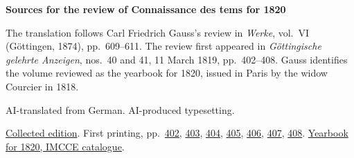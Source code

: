 \clearpage\thispagestyle{empty}
\begin{center}\Large\bfseries Sources for the review of Connaissance des tems for 1820\end{center}

The translation follows Carl Friedrich Gauss’s review in \emph{Werke}, vol.~VI (Göttingen, 1874), pp.~609--611. The review first appeared in \emph{Göttingische gelehrte Anzeigen}, nos.~40 and 41, 11 March 1819, pp.~402--408. Gauss identifies the volume reviewed as the yearbook for 1820, issued in Paris by the widow Courcier in 1818.

AI-translated from German. AI-produced typesetting.

\href{https://gdz.sub.uni-goettingen.de/id/PPN236007467}{Collected edition}. First printing, pp.~\href{https://images.p.sub.uni-goettingen.de/iiif/image/gdz:PPN319721507_1819:00000404/full/1650,/0/default.jpg}{402}, \href{https://images.p.sub.uni-goettingen.de/iiif/image/gdz:PPN319721507_1819:00000405/full/1650,/0/default.jpg}{403}, \href{https://images.p.sub.uni-goettingen.de/iiif/image/gdz:PPN319721507_1819:00000406/full/1650,/0/default.jpg}{404}, \href{https://images.p.sub.uni-goettingen.de/iiif/image/gdz:PPN319721507_1819:00000407/full/1650,/0/default.jpg}{405}, \href{https://images.p.sub.uni-goettingen.de/iiif/image/gdz:PPN319721507_1819:00000408/full/1650,/0/default.jpg}{406}, \href{https://images.p.sub.uni-goettingen.de/iiif/image/gdz:PPN319721507_1819:00000409/full/1650,/0/default.jpg}{407}, \href{https://images.p.sub.uni-goettingen.de/iiif/image/gdz:PPN319721507_1819:00000410/full/1650,/0/default.jpg}{408}. \href{https://cdt.imcce.fr/items/show/169}{Yearbook for 1820, IMCCE catalogue}.

\clearpage
